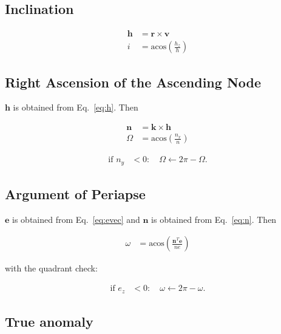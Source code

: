 \documentclass[]{article}
\newcommand{\vb}[1]{\bm{#1}} %
\begin{document}
\subsection{Inclination}

\begin{align}
\label{eq:h}
\vb{h} &= \vb{r} \times \vb{v} \\
i &= \mathrm{acos} \left( \frac{h_z}{h} \right)
\end{align}

\subsection{Right Ascension of the Ascending Node}

$\vb{h}$ is obtained from Eq.~\eqref{eq:h}. Then

\begin{align}
\label{eq:n}
\vb{n} &= \vb{k} \times \vb{h} \\
\Omega &= \mathrm{acos} \left( \frac{n_x}{n} \right)
\end{align}

\begin{align}
\text{if } n_y &< 0: \quad \Omega \leftarrow 2 \pi - \Omega.
\end{align}

\subsection{Argument of Periapse}

$\vb{e}$ is obtained from Eq.~\eqref{eq:evec} and $\vb{n}$ is obtained from Eq.~\eqref{eq:n}. Then

\begin{align}
\omega &= \mathrm{acos} \left( \frac{\vb{n}^T \vb{e}}{ne} \right)
\end{align}

\noindent with the quadrant check:

\begin{align}
\text{if } e_z &< 0: \quad \omega \leftarrow 2 \pi - \omega.
\end{align}

\subsection{True anomaly}
\end{document}
